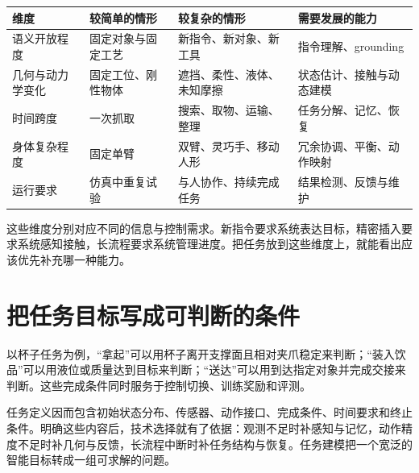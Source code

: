 \documentclass[UTF8,a4paper,11pt,oneside,openany,fontset=none]{ctexbook}
\begin{document}
{\small %
\begin{longtable}[]{@{}
  >{\raggedright\arraybackslash}p{}
  >{\raggedright\arraybackslash}p{}
  >{\raggedright\arraybackslash}p{}
  >{\raggedright\arraybackslash}p{}@{}}
\toprule\noalign{}
\begin{minipage}[b]{\linewidth}\raggedright
维度
\end{minipage} & \begin{minipage}[b]{\linewidth}\raggedright
较简单的情形
\end{minipage} & \begin{minipage}[b]{\linewidth}\raggedright
较复杂的情形
\end{minipage} & \begin{minipage}[b]{\linewidth}\raggedright
需要发展的能力
\end{minipage} \\
\midrule\noalign{}
\endhead
\bottomrule\noalign{}
\endlastfoot
语义开放程度 & 固定对象与固定工艺 & 新指令、新对象、新工具 & 指令理解、grounding \\
几何与动力学变化 & 固定工位、刚性物体 & 遮挡、柔性、液体、未知摩擦 & 状态估计、接触与动态建模 \\
时间跨度 & 一次抓取 & 搜索、取物、运输、整理 & 任务分解、记忆、恢复 \\
身体复杂程度 & 固定单臂 & 双臂、灵巧手、移动人形 & 冗余协调、平衡、动作映射 \\
运行要求 & 仿真中重复试验 & 与人协作、持续完成任务 & 结果检测、反馈与维护 \\
\end{longtable}
}

这些维度分别对应不同的信息与控制需求。新指令要求系统表达目标，精密插入要求系统感知接触，长流程要求系统管理进度。把任务放到这些维度上，就能看出应该优先补充哪一种能力。

\section{把任务目标写成可判断的条件}

以杯子任务为例，``拿起''可以用杯子离开支撑面且相对夹爪稳定来判断；``装入饮品''可以用液位或质量达到目标来判断；``送达''可以用到达指定对象并完成交接来判断。这些完成条件同时服务于控制切换、训练奖励和评测。

任务定义因而包含初始状态分布、传感器、动作接口、完成条件、时间要求和终止条件。明确这些内容后，技术选择就有了依据：观测不足时补感知与记忆，动作精度不足时补几何与反馈，长流程中断时补任务结构与恢复。任务建模把一个宽泛的智能目标转成一组可求解的问题。
\end{document}

